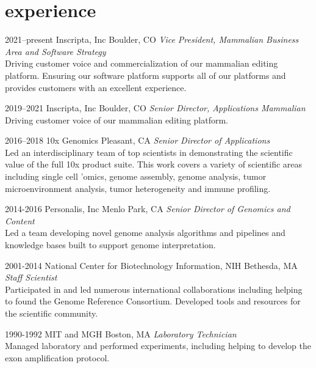 \documentclass[]{dmc-cv} %
\begin{document}
\section{experience}

\begin{entrylist}

\entry
{2021--present}
{Inscripta, Inc}
{Boulder, CO}
{\emph{Vice President, Mammalian Business Area and Software Strategy}\\
Driving customer voice and commercialization of our mammalian editing platform. Ensuring our software platform supports all of our platforms and provides customers with an excellent experience.
}

\entry
{2019--2021}
{Inscripta, Inc}
{Boulder, CO}
{\emph{Senior Director, Applications Mammalian}\\
Driving customer voice of our mammalian editing platform.
}

\entry
{2016--2018}
{10x Genomics}
{Pleasant, CA}
{\emph{Senior Director of Applications} \\
Led an interdisciplinary team of top scientists in demonstrating the scientific value of the full
10x product suite. This work covers a variety of scientific areas including single cell 'omics, genome assembly, genome analysis,
tumor microenvironment analysis, tumor heterogeneity and immune profiling.
}

\entry
{2014-2016}
{Personalis, Inc}
{Menlo Park, CA}
{\emph{Senior Director of Genomics and Content} \\
Led a team developing novel genome analysis algorithms and pipelines and knowledge bases built to support genome interpretation.
}

\entry
{2001-2014}
{National Center for Biotechnology Information, NIH}
{Bethesda, MA}
{\emph{Staff Scientist} \\
Participated in and led numerous international collaborations including helping to found the Genome Reference Consortium. Developed tools and resources for the scientific community.
}

\entry
{1990-1992}
{MIT and MGH}
{Boston, MA}
{\emph{Laboratory Technician}\\
Managed laboratory and performed experiments, including helping to develop the exon amplification protocol.
}

\end{entrylist}

\end{document}
